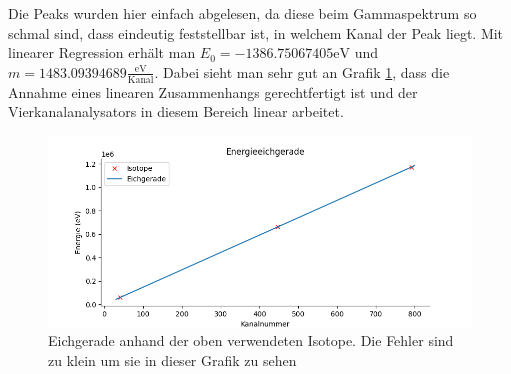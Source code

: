  Die Peaks wurden hier einfach abgelesen, da diese beim Gammaspektrum so schmal sind, dass eindeutig feststellbar ist, in welchem Kanal der Peak liegt.
 Mit linearer Regression erhält man $E_0 = -1386.75067405 \mathrm{ eV}$ und $m = 1483.09394689 \frac{\mathrm{eV}}{\mathrm{Kanal}}$.
 Dabei sieht man sehr gut an Grafik \ref{Eichgerade}, dass die Annahme eines linearen Zusammenhangs gerechtfertigt ist und der Vierkanalanalysators in 
 diesem Bereich linear arbeitet.

 \begin{figure}[ht]
    \captionsetup{justification=centering,margin=1cm}
     \centering
     \includegraphics[width = \linewidth]{Bilder/Auswertung/EnergieeichgeradeGamma.png}
     \caption{Eichgerade anhand der oben verwendeten Isotope. Die Fehler sind zu klein um sie in dieser Grafik zu sehen}
     \label{Eichgerade}
 \end{figure}